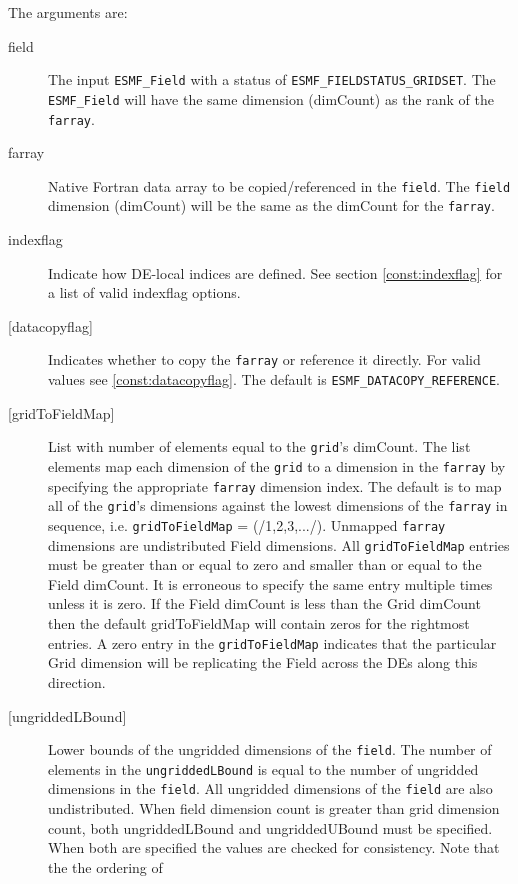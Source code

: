   
   The arguments are: 
   \begin{description} 
   \item [field] 
   The input {\tt ESMF\_Field} with a status of 
   {\tt ESMF\_FIELDSTATUS\_GRIDSET}. 
   The {\tt ESMF\_Field} will have the same dimension 
   (dimCount) as the rank of the {\tt farray}. 
   \item [farray] 
   Native Fortran data array to be copied/referenced in the {\tt field}. 
   The {\tt field} dimension (dimCount) will be the same as the dimCount 
   for the {\tt farray}. 
   \item [indexflag] 
   Indicate how DE-local indices are defined. See section 
   \ref{const:indexflag} for a list of valid indexflag options. 
   \item [{[datacopyflag]}] 
   Indicates whether to copy the {\tt farray} or reference it directly. 
   For valid values see \ref{const:datacopyflag}. The default is 
   {\tt ESMF\_DATACOPY\_REFERENCE}. 
   \item [{[gridToFieldMap]}] 
   List with number of elements equal to the 
   {\tt grid}'s dimCount. The list elements map each dimension 
   of the {\tt grid} to a dimension in the {\tt farray} by 
   specifying the appropriate {\tt farray} dimension index. The 
   default is to map all of the {\tt grid}'s dimensions against the 
   lowest dimensions of the {\tt farray} in sequence, i.e. 
   {\tt gridToFieldMap} = (/1,2,3,.../). 
   Unmapped {\tt farray} dimensions are undistributed Field 
   dimensions. 
   All {\tt gridToFieldMap} entries must be greater than or equal 
   to zero and smaller than or equal to the Field dimCount. It is erroneous 
   to specify the same entry multiple times unless it is zero. 
   If the Field dimCount is less than the Grid dimCount then the default 
   gridToFieldMap will contain zeros for the rightmost entries. A zero 
   entry in the {\tt gridToFieldMap} indicates that the particular 
   Grid dimension will be replicating the Field across the DEs along 
   this direction. 
   \item [{[ungriddedLBound]}] 
   Lower bounds of the ungridded dimensions of the {\tt field}. 
   The number of elements in the {\tt ungriddedLBound} is equal to the number of ungridded 
   dimensions in the {\tt field}. All ungridded dimensions of the 
   {\tt field} are also undistributed. When field dimension count is 
   greater than grid dimension count, both ungriddedLBound and ungriddedUBound 
   must be specified. When both are specified the values are checked 
   for consistency. Note that the the ordering of 

\end{description}
